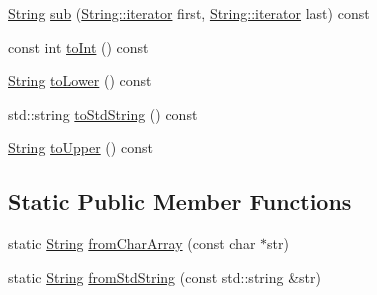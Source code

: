 \begin{DoxyCompactItemize}
\item 
\hyperlink{classprism_1_1_string}{String} \hyperlink{classprism_1_1_string_acb6b7f719571cccca2f08887e61ed2a5}{sub} (\hyperlink{classprism_1_1_string_adacc7975837e5fff95d70690777fb330}{String\+::iterator} first, \hyperlink{classprism_1_1_string_adacc7975837e5fff95d70690777fb330}{String\+::iterator} last) const 
\item 
const int \hyperlink{classprism_1_1_string_afbf22d03096777ef6909794edc18a0f9}{to\+Int} () const 
\item 
\hyperlink{classprism_1_1_string}{String} \hyperlink{classprism_1_1_string_ac75330b46da019ccf2c964e4c2fd9f81}{to\+Lower} () const 
\item 
std\+::string \hyperlink{classprism_1_1_string_ad1018741610a6723a38ab52255147ac4}{to\+Std\+String} () const 
\item 
\hyperlink{classprism_1_1_string}{String} \hyperlink{classprism_1_1_string_afd1fc3691cbc2f267fc3d1d8f27d2c3a}{to\+Upper} () const 
\end{DoxyCompactItemize}
\subsection*{Static Public Member Functions}
\begin{DoxyCompactItemize}
\item 
static \hyperlink{classprism_1_1_string}{String} \hyperlink{classprism_1_1_string_a11d319bfb0bf70ffdf71d2fc65b963db}{from\+Char\+Array} (const char $\ast$str)
\item 
static \hyperlink{classprism_1_1_string}{String} \hyperlink{classprism_1_1_string_a8692b9a7e4c25f349bb83b53ff3d6f36}{from\+Std\+String} (const std\+::string \&str)
\end{DoxyCompactItemize}
